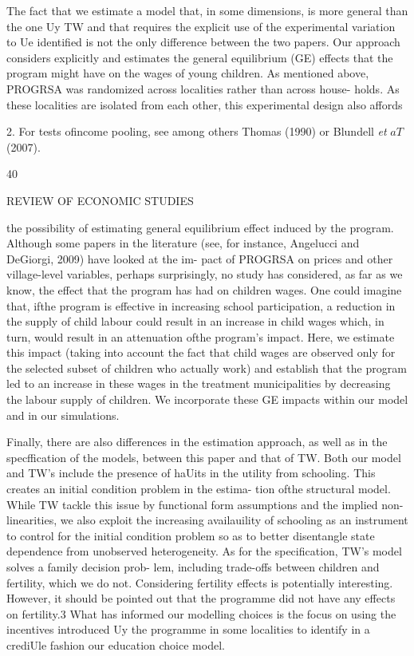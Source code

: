 The fact that we estimate a model that, in some dimensions, is more general than the one Uy TW and that requires the explicit use of the experimental variation to Ue identified is not the only difference between the two papers. Our approach considers explicitly and estimates the general equilibrium (GE) effects that the program might have on the wages of young children. As mentioned above, PROGRSA was randomized across localities rather than across house- holds. As these localities are isolated from each other, this experimental design also affords

2. For tests ofincome pooling, see among others Thomas (1990) or Blundell {\it et} $aT$ (2007).

40

REVIEW OF ECONOMIC STUDIES

the possibility of estimating general equilibrium effect induced by the program. Although some papers in the literature (see, for instance, Angelucci and DeGiorgi, 2009) have looked at the im- pact of PROGRSA on prices and other village-level variables, perhaps surprisingly, no study has considered, as far as we know, the effect that the program has had on children wages. One could imagine that, ifthe program is effective in increasing school participation, a reduction in the supply of child labour could result in an increase in child wages which, in turn, would result in an attenuation ofthe program's impact. Here, we estimate this impact (taking into account the fact that child wages are observed only for the selected subset of children who actually work) and establish that the program led to an increase in these wages in the treatment municipalities by decreasing the labour supply of children. We incorporate these GE impacts within our model and in our simulations.

Finally, there are also differences in the estimation approach, as well as in the specffication of the models, between this paper and that of TW. Both our model and TW's include the presence of haUits in the utility from schooling. This creates an initial condition problem in the estima- tion ofthe structural model. While TW tackle this issue by functional form assumptions and the implied non-linearities, we also exploit the increasing availauility of schooling as an instrument to control for the initial condition problem so as to better disentangle state dependence from unobserved heterogeneity. As for the specification, TW's model solves a family decision prob- lem, including trade-offs between children and fertility, which we do not. Considering fertility effects is potentially interesting. However, it should be pointed out that the programme did not have any effects on fertility.3 What has informed our modelling choices is the focus on using the incentives introduced Uy the programme in some localities to identify in a crediUle fashion our education choice model.


